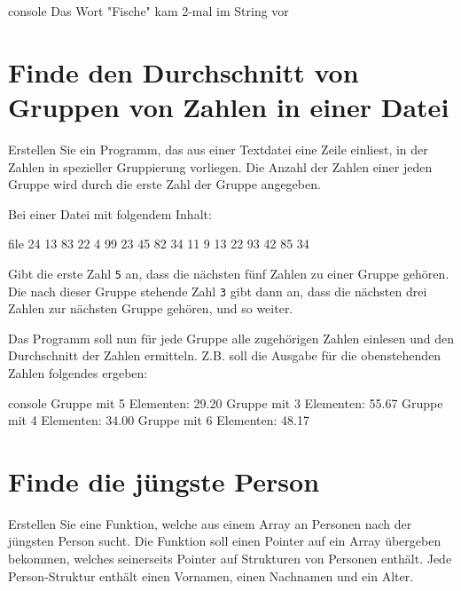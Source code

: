 \begin{mybox}[Bildschirmausgabe]{console}
Das Wort "Fische" kam 2-mal im String vor
\end{mybox}



\chapter{Finde den Durchschnitt von Gruppen von Zahlen in einer Datei}

\vspace{10pt}

Erstellen Sie ein Programm, das aus einer Textdatei eine Zeile einliest, in der
Zahlen in spezieller Gruppierung vorliegen. Die Anzahl der Zahlen einer jeden
Gruppe wird durch die erste Zahl der Gruppe angegeben.

Bei einer Datei mit folgendem Inhalt:

\begin{mybox}{file}
 24 13 83 22 4  99 23 45  82 34 11 9  13 22 93 42 85 34
\end{mybox}

Gibt die erste Zahl \texttt{5} an, dass die nächsten fünf Zahlen zu
einer Gruppe gehören. Die nach dieser Gruppe stehende Zahl \texttt{3}
gibt dann an, dass die nächsten drei Zahlen zur nächsten Gruppe gehören, und so
weiter.

Das Programm soll nun für jede Gruppe alle zugehörigen Zahlen einlesen und den
Durchschnitt der Zahlen ermitteln. Z.B. soll die Ausgabe für die obenstehenden
Zahlen folgendes ergeben:

\begin{mybox}[Bildschirmausgabe]{console}
Gruppe mit 5 Elementen: 29.20
Gruppe mit 3 Elementen: 55.67
Gruppe mit 4 Elementen: 34.00
Gruppe mit 6 Elementen: 48.17
\end{mybox}




\chapter{Finde die jüngste Person}

\vspace{10pt}

Erstellen Sie eine Funktion, welche aus einem Array an Personen nach der
jüngsten Person sucht. Die Funktion soll einen Pointer auf ein Array übergeben
bekommen, welches seinerseits Pointer auf Strukturen von Personen enthält. Jede
Person-Struktur enthält einen Vornamen, einen Nachnamen und ein Alter.


